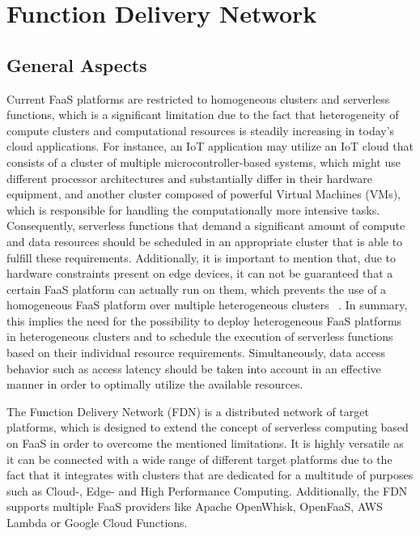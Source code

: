 \chapter{Function Delivery Network}\label{chapter:FDN}

\section{General Aspects}
Current FaaS platforms are restricted to homogeneous clusters and serverless functions, which is a significant limitation due to the fact that heterogeneity of compute clusters and computational resources is steadily increasing in today's cloud applications. For instance, an IoT application may utilize an IoT cloud that consists of a cluster of multiple microcontroller-based systems, which might use different processor architectures and substantially differ in their hardware equipment, and another cluster composed of powerful Virtual Machines (VMs), which is responsible for handling the computationally more intensive tasks. Consequently, serverless functions that demand a significant amount of compute and data resources should be scheduled in an appropriate cluster that is able to fulfill these requirements. Additionally, it is important to mention that, due to hardware constraints present on edge devices, it can not be guaranteed that a certain FaaS platform can actually run on them, which prevents the use of a homogeneous FaaS platform over multiple heterogeneous clusters ~\parencite{fdn}. In summary, this implies the need for the possibility to deploy heterogeneous FaaS platforms in heterogeneous clusters and to schedule the execution of serverless functions based on their individual resource requirements. Simultaneously, data access behavior such as access latency should be taken into account in an effective manner in order to optimally utilize the available resources.

The Function Delivery Network (FDN) is a distributed network of target platforms, which is designed to extend the concept of serverless computing based on FaaS in order to overcome the mentioned limitations. It is highly versatile as it can be connected with a wide range of different target platforms due to the fact that it integrates with clusters that are dedicated for a multitude of purposes such as Cloud-, Edge- and High Performance Computing. Additionally, the FDN supports multiple FaaS providers like Apache OpenWhisk, OpenFaaS, AWS Lambda or Google Cloud Functions. 

